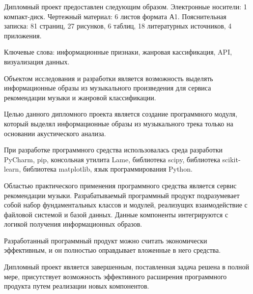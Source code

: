 \begin{titlepage}
\label{sec:ref}

Дипломный проект предоставлен следующим образом. Электронные носители: 1 компакт-диск. Чертежный материал: 6 листов формата А1. Пояснительная записка: 81 страниц, 27 рисунков, 6 таблиц, 18 литературных источников, 4 приложения.

Ключевые слова: информационные признаки, жанровая кассификация, API, визуализация данных.

Объектом исследования и разработки является возможность выделять информационные образы из музыкального произведения для сервиса рекомендации музыки и жанровой классификации.

Целью данного дипломного проекта является создание программного модуля, который выделял информационные образы из музыкального трека только на основании  акустического анализа.

При разработке программного средства использовалась среда разработки PyCharm, pip, консольная утилита Lame, библиотека scipy, библиотека scikit-learn, библиотека matplotlib, язык программирования Python.

Областью практического применения программного средства является сервис рекомендации музыки. Разрабатываемый программный продукт подразумевает собой набор фундаментальных классов и модулей, реализущих взаимодействие с файловой системой и базой данных. 
Данные компоненты интегрируются с логикой получения информационных образов. 

Разработанный программный продукт можно считать экономически эффективным, и он полностью оправдывает вложенные в него средства.

Дипломный проект является завершенным, поставленная задача решена в полной мере, присутствует возможность эффективного расширения программного продукта путем реализации новых компонентов.
\end{titlepage}